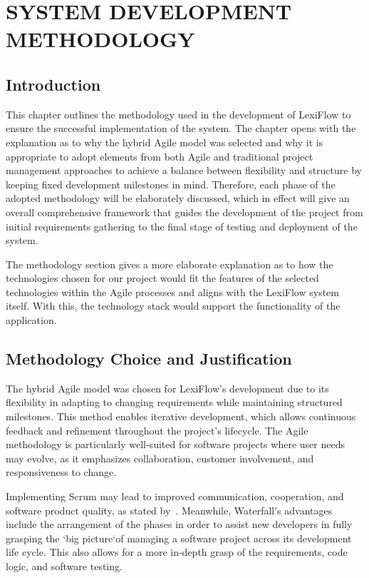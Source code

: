 \documentclass[oneside]{utmthesis}
\begin{document}
\chapter{SYSTEM DEVELOPMENT METHODOLOGY}
\section{Introduction}
This chapter outlines the methodology used in the development of LexiFlow to ensure the successful implementation of the system. The chapter opens with the explanation as to why the hybrid Agile model was selected and why it is appropriate to adopt elements from both Agile and traditional project management approaches to achieve a balance between flexibility and structure by keeping fixed development milestones in mind. Therefore, each phase of the adopted methodology will be elaborately discussed, which in effect will give an overall comprehensive framework that guides the development of the project from initial requirements gathering to the final stage of testing and deployment of the system.

The methodology section gives a more elaborate explanation as to how the
technologies chosen for our project would fit the features of the selected technologies within the Agile processes and aligns with the LexiFlow system itself. With this, the technology stack would support the functionality of the application.

\section{Methodology Choice and Justification}
The hybrid Agile model was chosen for LexiFlow's development due to its flexibility in adapting to changing requirements while maintaining structured milestones. This method enables iterative development, which allows continuous feedback and refinement throughout the project's lifecycle. The Agile methodology is particularly well-suited for software projects where user needs may evolve, as it emphasizes collaboration, customer involvement, and responsiveness to change.

Implementing Scrum may lead to improved communication, cooperation, and software product quality, as stated by~\citet{scrum}.  Meanwhile, Waterfall's advantages include the arrangement of the phases in order to assist new developers in fully grasping the `big picture`of managing a software project across its development life cycle.  This also allows for a more in-depth grasp of the requirements, code logic, and software testing.
\end{document}

